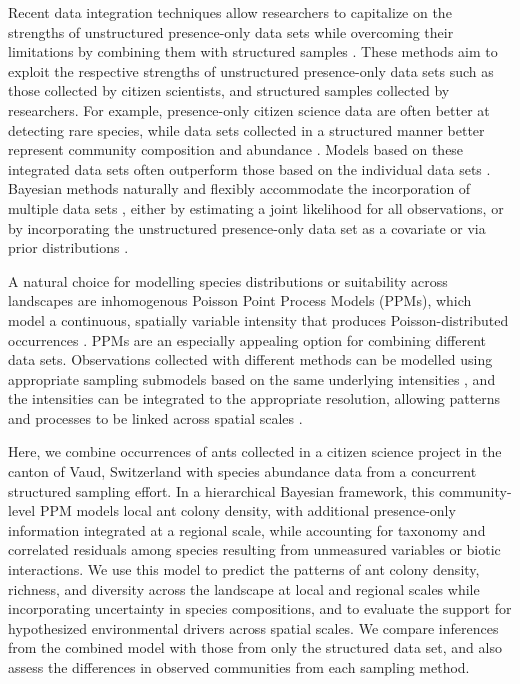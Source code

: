 \documentclass[preprint,review,times,12pt,3p]{elsarticle}
\begin{document}
Recent data integration techniques allow researchers to capitalize on the strengths of unstructured presence-only data sets while overcoming their limitations by combining them with structured samples \citep{Isaac2019,Miller2019}. These methods aim to exploit the respective strengths of unstructured presence-only data sets such as those collected by citizen scientists, and structured samples collected by researchers. For example, presence-only citizen science data are often better at detecting rare species, while data sets collected in a structured manner better represent community composition and abundance \citep{Steen2019,Henckel2020,Pernat2020}. Models based on these integrated data sets often outperform those based on the individual data sets \citep{Dorazio2014b,Fithian2015,Koshkina2017a}. Bayesian methods naturally and flexibly accommodate the incorporation of multiple data sets \citep{Clark2005,BeckEtAl2012,Szewczyk2018}, either by estimating a joint likelihood for all observations, or by incorporating the unstructured presence-only data set as a covariate or via prior distributions \citep{Fletcher2019,Isaac2019,Miller2019}. 

A natural choice for modelling species distributions or suitability across landscapes are inhomogenous Poisson Point Process Models (PPMs), which model a continuous, spatially variable intensity that produces Poisson-distributed occurrences \citep{Renner2013a,Renner2015}. PPMs are an especially appealing option for combining different data sets. Observations collected with different methods can be modelled using appropriate sampling submodels based on the same underlying intensities \citep{Fithian2015,Hefley2016,Koshkina2017a,Fletcher2019,Renner2019}, and the intensities can be integrated to the appropriate resolution, allowing patterns and processes to be linked across spatial scales \citep{Keil2014,Hefley2016}.

Here, we combine occurrences of ants collected in a citizen science project in the canton of Vaud, Switzerland with species abundance data from a concurrent structured sampling effort. In a hierarchical Bayesian framework, this community-level PPM models local ant colony density, with additional presence-only information integrated at a regional scale, while accounting for taxonomy and correlated residuals among species resulting from unmeasured variables or biotic interactions. We use this model to predict the patterns of ant colony density, richness, and diversity across the landscape at local and regional scales while incorporating uncertainty in species compositions, and to evaluate the support for hypothesized environmental drivers across spatial scales. We compare inferences from the combined model with those from only the structured data set, and also assess the differences in observed communities from each sampling method. 
\end{document}
